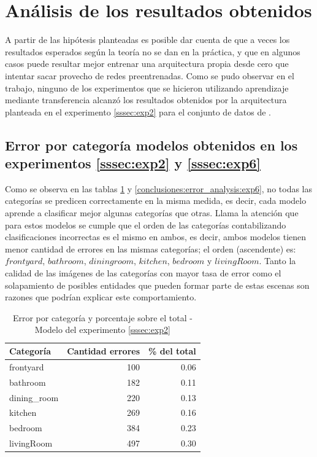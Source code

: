 \section{Análisis de los resultados obtenidos}\label{error_analysis}
A partir de las hipótesis planteadas es posible dar cuenta de que a veces los resultados esperados según la teoría no se dan en la práctica, y que en algunos casos puede resultar mejor entrenar una arquitectura propia desde cero que intentar sacar provecho de redes preentrenadas. Como se pudo observar en el trabajo, ninguno de los experimentos que se hicieron utilizando aprendizaje mediante transferencia alcanzó los resultados obtenidos por la arquitectura planteada en el experimento \ref{sssec:exp2} para el conjunto de datos de \cite{vision_based_real_estate_price_estimation}.

\subsection{Error por categoría modelos obtenidos en los experimentos \ref{sssec:exp2} y \ref{sssec:exp6}}
Como se observa en las tablas \ref{conclusiones:error_analysis:exp2} y \ref{conclusiones:error_analysis:exp6}, no todas las categorías se predicen correctamente en la misma medida, es decir, cada modelo aprende a clasificar mejor algunas categorías que otras. Llama la atención que para estos modelos se cumple que el orden de las categorías contabilizando clasificaciones incorrectas es el mismo en ambos, es decir, ambos modelos tienen menor cantidad de errores en las mismas categorías; el orden (ascendente) es: \(frontyard\), \(bathroom\), \(dining room\), \(kitchen\), \(bedroom\) y \(livingRoom\). Tanto la calidad de las imágenes de las categorías con mayor tasa de error como el solapamiento de posibles entidades que pueden formar parte de estas escenas son razones que podrían explicar este comportamiento. 


\begin{table}[h!]
	\centering
	\begin{tabular}{| l | r | r |}
		\toprule
		Categoría &    Cantidad errores &     \% del total \\
		\midrule
		frontyard &  100 &  0.06 \\
		bathroom &  182 &  0.11 \\
		dining\_room &  220 &  0.13 \\
		kitchen &  269 &  0.16 \\
		bedroom &  384 &  0.23 \\
		livingRoom &  497 &  0.30 \\
		\bottomrule
	\end{tabular}
	\caption{Error por categoría y porcentaje sobre el total - Modelo del experimento \ref{sssec:exp2}}
	\label{conclusiones:error_analysis:exp2}
\end{table}

